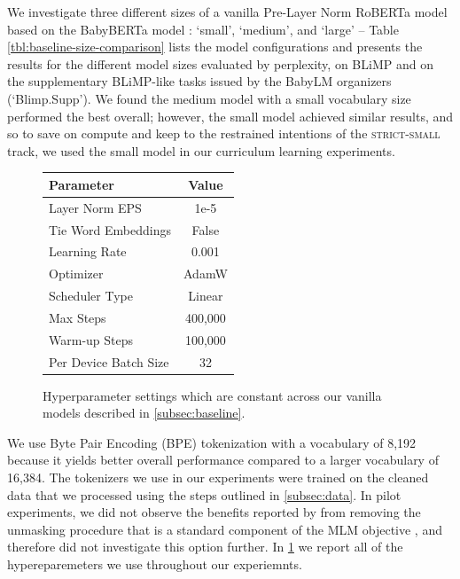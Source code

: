 We investigate three different sizes of a vanilla Pre-Layer Norm RoBERTa model \cite{liu2019roberta} based on the BabyBERTa model \cite{huebner2021babyberta}: `small', `medium', and `large' -- Table \ref{tbl:baseline-size-comparison} lists the model configurations and presents the results for the different model sizes evaluated by perplexity, on BLiMP \cite{warstadt2020blimp} and on the supplementary BLiMP-like tasks issued by the BabyLM organizers (`Blimp.Supp'). We found the medium model with a small vocabulary size performed the best overall; however, the small model achieved similar results, and so to save on compute and keep to the restrained intentions of the \textsc{strict-small} track, we used the small model in our curriculum learning experiments.

\begin{figure}
    \centering
    \small
    \begin{tabular}{lc}
    \toprule
         Parameter& Value\\
    \midrule
         Layer Norm EPS& 1e-5 \\
         Tie Word Embeddings & False \\
         Learning Rate & 0.001 \\
         Optimizer & AdamW \\
         Scheduler Type & Linear\\
         Max Steps & 400,000 \\
         Warm-up Steps & 100,000\\
         Per Device Batch Size & 32 \\
    \bottomrule
    \end{tabular}
    \caption{Hyperparameter settings which are constant across our vanilla models described in \ref{subsec:baseline}.}
    \label{tbl:baseline_hyperparams}
\end{figure}

We use Byte Pair Encoding (BPE) tokenization \cite{gage1994bpe} with a vocabulary of 8,192 because it yields better overall performance compared to a larger vocabulary of 16,384. The tokenizers we use in our experiments were trained on the cleaned data that we processed using the steps outlined in \ref{subsec:data}. In pilot experiments, we did not observe the benefits reported by \citet{huebner2021babyberta} from removing the unmasking procedure that is a standard component of the MLM objective \cite{devlin2019bert}, and therefore did not investigate this option further. In \cref{tbl:baseline_hyperparams} we report all of the hypereparemeters we use throughout our experiemnts.


